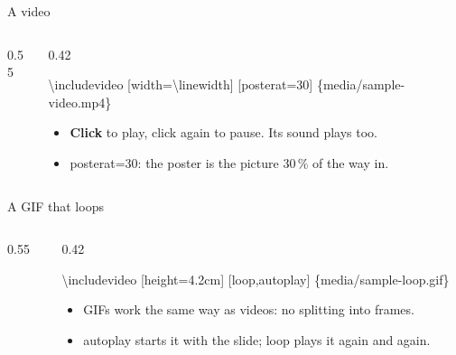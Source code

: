 \documentclass[aspectratio=169]{beamer}
\newcommand{\code}[1]{{\small\ttfamily #1}}
\begin{document}
\begin{frame}[fragile]{A video}
  \begin{columns}[c]
    \begin{column}{0.55\textwidth}
    \end{column}
    \begin{column}{0.42\textwidth}
\begin{semiverbatim}\footnotesize
\textbackslash{}includevideo
  [width=\textbackslash{}linewidth]
  [posterat=30]
  \{media/sample-video.mp4\}
\end{semiverbatim}
      \begin{itemize}
        \item \textbf{Click} to play, click again to pause. Its sound plays too.
        \item \code{posterat=30}: the poster is the picture 30\,\% of the way in.
      \end{itemize}
    \end{column}
  \end{columns}
\end{frame}

\begin{frame}[fragile]{A GIF that loops}
  \begin{columns}[c]
    \begin{column}{0.55\textwidth}
      \centering
    \end{column}
    \begin{column}{0.42\textwidth}
\begin{semiverbatim}\footnotesize
\textbackslash{}includevideo
  [height=4.2cm]
  [loop,autoplay]
  \{media/sample-loop.gif\}
\end{semiverbatim}
      \begin{itemize}
        \item GIFs work the same way as videos: no splitting into frames.
        \item \code{autoplay} starts it with the slide; \code{loop} plays it again and again.
      \end{itemize}
    \end{column}
  \end{columns}
\end{frame}
\end{document}
